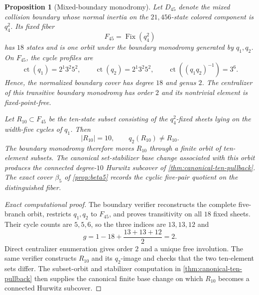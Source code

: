 \documentclass[11pt]{article}
\newtheorem{proposition}[theorem]{Proposition}
\theoremstyle{remark}
\newcommand{\ct}{\operatorname{ct}}
\begin{document}
\begin{proposition}[Mixed-boundary monodromy]\label{prop:mixed-boundary-monodromy}
Let $D_{45}$ denote the mixed collision boundary whose normal inertia on the $21{,}456$-state colored component is $q_4^2$.  Its fixed fiber
\[
 F_{45}=\operatorname{Fix}(q_4^2)
\]
has $18$ states and is one orbit under the boundary monodromy generated by $q_1,q_2$.  On $F_{45}$, the cycle profiles are
\[
 \ct(q_1)=2^1 3^2 5^2,
 \qquad
 \ct(q_2)=2^1 3^2 5^2,
 \qquad
 \ct((q_1q_2)^{-1})=3^6.
\]
Hence, the normalized boundary cover has degree $18$ and genus $2$.  The centralizer of this transitive boundary monodromy has order $2$ and its nontrivial element is fixed-point-free.

Let $R_{10}\subset F_{45}$ be the ten-state subset consisting of the $q_4^2$-fixed sheets lying on the width-five cycles of $q_1$.  Then
\[
 |R_{10}|=10,
 \qquad
 q_2(R_{10})\ne R_{10}.
\]
The boundary monodromy therefore moves $R_{10}$ through a finite orbit of ten-element subsets.  The canonical set-stabilizer base change associated with this orbit produces the connected degree-$10$ Hurwitz subcover of \cref{thm:canonical-ten-pullback}.  The exact cover $\beta_5$ of \cref{prop:beta5} records the cyclic five-pair quotient on the distinguished fiber.
\end{proposition}

\begin{proof}[Exact computational proof]
The boundary verifier reconstructs the complete five-branch orbit, restricts $q_1,q_2$ to $F_{45}$, and proves transitivity on all $18$ fixed sheets.  Their cycle counts are $5,5,6$, so the three indices are $13,13,12$ and
\[
 g=1-18+\frac{13+13+12}{2}=2.
\]
Direct centralizer enumeration gives order $2$ and a unique free involution.  The same verifier constructs $R_{10}$ and its $q_2$-image and checks that the two ten-element sets differ.  The subset-orbit and stabilizer computation in \cref{thm:canonical-ten-pullback} then supplies the canonical finite base change on which $R_{10}$ becomes a connected Hurwitz subcover.
\end{proof}
\end{document}
